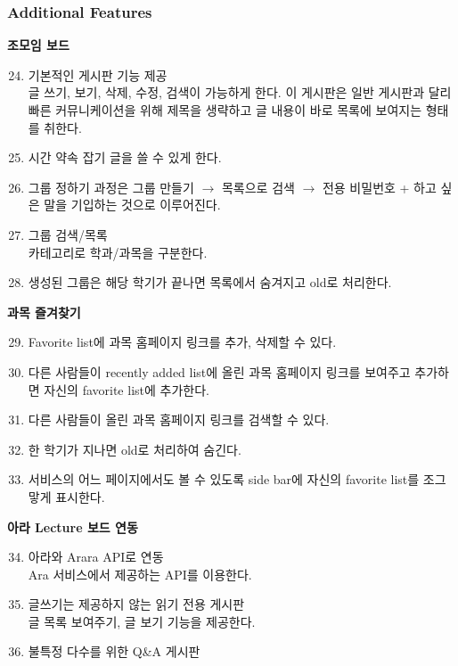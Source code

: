 \documentclass[a4paper,titlepage]{article}
\begin{document}
\subsubsection{Additional Features}
\begin{funcreq}
	\setcounter{enumi}{3}
	\item\textbf{조모임 보드}
	\begin{enumerate}
		\setcounter{enumii}{23}
		\item 기본적인 게시판 기능 제공\\
		글 쓰기, 보기, 삭제, 수정, 검색이 가능하게 한다.
		이 게시판은 일반 게시판과 달리 빠른 커뮤니케이션을 위해 제목을 생략하고 글 내용이 바로 목록에 보여지는 형태를 취한다.
		\item 시간 약속 잡기 글을 쓸 수 있게 한다.
		\item 그룹 정하기 과정은 그룹 만들기 $\rightarrow$ 목록으로 검색 $\rightarrow$ 전용 비밀번호 + 하고 싶은 말을 기입하는 것으로 이루어진다.
		\item 그룹 검색/목록\\
		카테고리로 학과/과목을 구분한다.
		\item 생성된 그룹은 해당 학기가 끝나면 목록에서 숨겨지고 old로 처리한다. 
	\end{enumerate}
	\item\textbf{과목 즐겨찾기}
	\begin{enumerate}
		\setcounter{enumii}{28}
		\item Favorite list에 과목 홈페이지 링크를 추가, 삭제할 수 있다.
		\item 다른 사람들이 recently added list에 올린 과목 홈페이지 링크를 보여주고 추가하면 자신의 favorite list에 추가한다.
		\item 다른 사람들이 올린 과목 홈페이지 링크를 검색할 수 있다.
		\item 한 학기가 지나면 old로 처리하여 숨긴다.
		\item 서비스의 어느 페이지에서도 볼 수 있도록 side bar에 자신의 favorite list를 조그맣게 표시한다.
	\end{enumerate}
	\item\textbf{아라 Lecture 보드 연동}
	\begin{enumerate}
		\setcounter{enumii}{33}
		\item 아라와 Arara API로 연동\\
		Ara 서비스에서 제공하는 API를 이용한다. 
		\item 글쓰기는 제공하지 않는 읽기 전용 게시판\\
		글 목록 보여주기, 글 보기 기능을 제공한다. 
		\item 불특정 다수를 위한 Q\&A 게시판
	\end{enumerate}
\end{funcreq}
\end{document}
